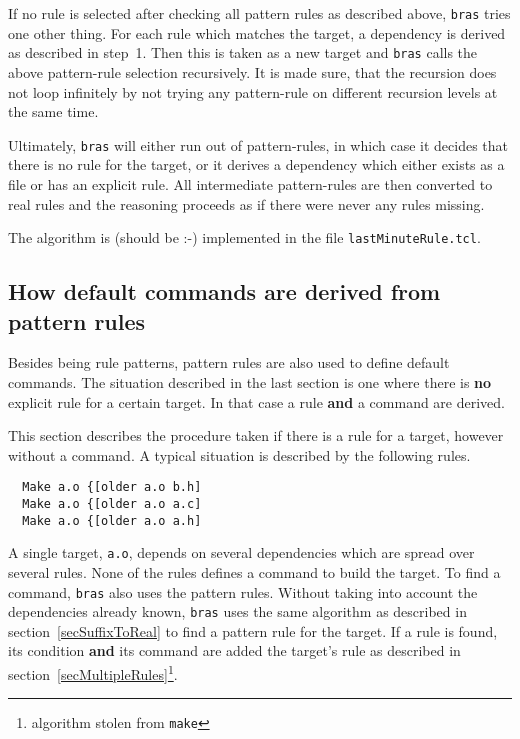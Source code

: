 \documentclass[11pt]{scrartcl}
\makeatletter
\newcommand{\bras}{\texttt{bras}}
\newcommand{\make}{\texttt{make}}
\newcommand{\Indextt}[1]{\texttt{#1}\index{#1@\texttt{#1}}}
\makeatother
\begin{document}
If no rule is selected after checking all pattern rules as described
above, \bras{} tries one other thing. For each rule which matches the
target, a dependency is derived as described in step~1. Then this is
taken as a new target and \bras{} calls the above pattern-rule
selection recursively. It is made sure, that the recursion does not
loop infinitely by not trying any pattern-rule on different recursion
levels at the same time.

Ultimately, \bras{} will either run out of pattern-rules, in which
case it decides that there is no rule for the target, or it derives a
dependency which either exists as a file or has an explicit rule. All
intermediate pattern-rules are then converted to real rules and the
reasoning proceeds as if there were never any rules missing.

The algorithm is (should be :-) implemented in the file
\Indextt{lastMinuteRule.tcl}.

\subsection{How default commands are derived from pattern rules}
\label{secSuffixAsDefCmd}
Besides being rule patterns, pattern rules are also used to define
default commands. The situation described in the last section is one
where there is \textbf{no} explicit rule for a certain target. In that
case a rule \textbf{and} a command are derived.

This section describes the procedure taken if there is a rule for a
target, however without a command. A typical situation is described by
the following rules.

\begin{verbatim}
  Make a.o {[older a.o b.h]
  Make a.o {[older a.o a.c]
  Make a.o {[older a.o a.h]
\end{verbatim}

A single target, \texttt{a.o}, depends on several dependencies which
are spread over several rules. None of the rules defines a command to
build the target. To find a command, \bras{} also uses the pattern
rules. Without taking into account the dependencies already known,
\bras{} uses the same algorithm as described in
section~\ref{secSuffixToReal} to find a pattern rule for the target.
If a rule is found, its condition \textbf{and} its command are added
the target's rule as described in
section~\ref{secMultipleRules}\footnote{algorithm stolen from \make{}}.
\end{document}
